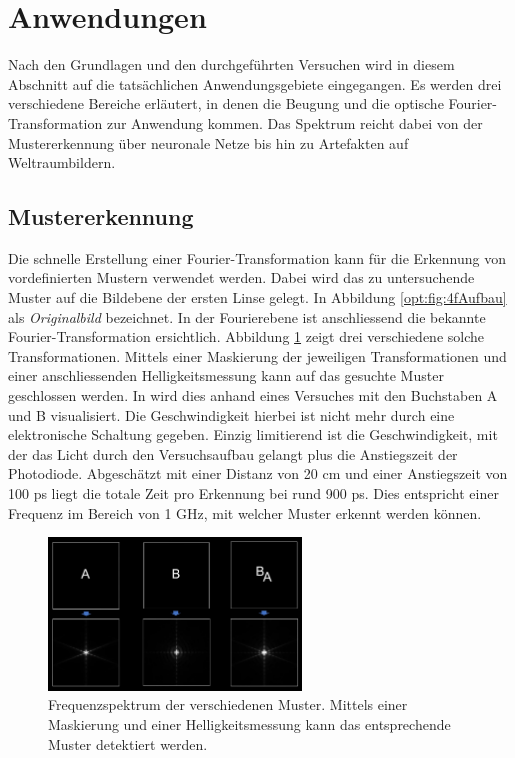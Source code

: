 %
%
%
%
\section{Anwendungen}
\label{opt:section:anwendungen}

Nach den Grundlagen und den durchgeführten Versuchen wird in diesem Abschnitt auf die tatsächlichen Anwendungsgebiete eingegangen.
Es werden drei verschiedene Bereiche erläutert, in denen die Beugung und die optische Fourier-Transformation zur Anwendung kommen.
Das Spektrum reicht dabei von der Mustererkennung über neuronale Netze bis hin zu Artefakten auf Weltraumbildern.

\subsection{Mustererkennung}
Die schnelle Erstellung einer Fourier-Transformation kann für die Erkennung von vordefinierten Mustern verwendet werden.
Dabei wird das zu untersuchende Muster auf die Bildebene der ersten Linse gelegt. 
In Abbildung \ref{opt:fig:4fAufbau} als \emph{Originalbild} bezeichnet.
In der Fourierebene ist anschliessend die bekannte Fourier-Transformation ersichtlich.
Abbildung \ref{opt:fig:patternYT} zeigt drei verschiedene solche Transformationen.
Mittels einer Maskierung der jeweiligen Transformationen und einer anschliessenden Helligkeitsmessung kann auf das gesuchte Muster geschlossen werden.
In \cite{opt:YT:PatternRecognition} wird dies anhand eines Versuches mit den Buchstaben A und B visualisiert.
Die Geschwindigkeit hierbei ist nicht mehr durch eine elektronische Schaltung gegeben.
Einzig limitierend ist die Geschwindigkeit, mit der das Licht durch den Versuchsaufbau gelangt plus die Anstiegszeit der Photodiode.
Abgeschätzt mit einer Distanz von 20 cm und einer Anstiegszeit von 100 ps liegt die totale Zeit pro Erkennung bei rund 900 ps.
Dies entspricht einer Frequenz im Bereich von 1 GHz, mit welcher Muster erkennt werden können.

\begin{figure}
    \centering
    \includegraphics[width=0.6\textwidth]{papers/opt/images/pattern_YT.png}
    \caption{Frequenzspektrum der verschiedenen Muster. 
    Mittels einer Maskierung und einer Helligkeitsmessung kann das entsprechende Muster detektiert werden.}
    \label{opt:fig:patternYT}
\end{figure}

